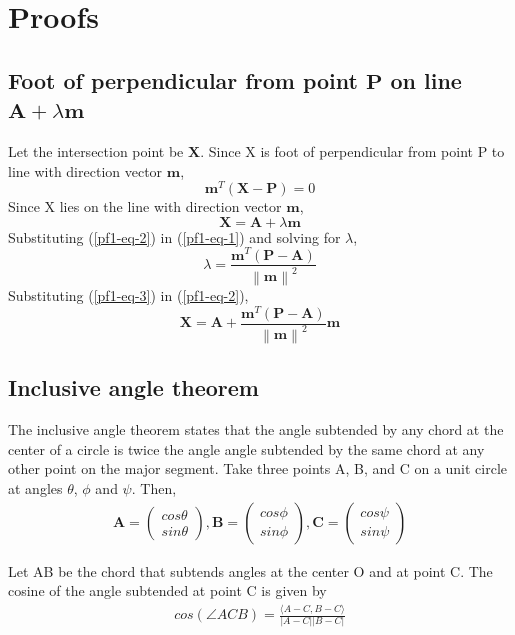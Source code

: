 \documentclass[journal,10pt,twocolumn]{article}
\providecommand{\norm}[1]{\left\lVert#1\right\rVert}
\let\vec\mathbf
\newcommand{\myvec}[1]{\ensuremath{\begin{pmatrix}#1\end{pmatrix}}}
\begin{document}
\section*{\large Proofs}
\subsection*{\normalsize Foot of perpendicular from point $\vec{P}$ on line $\vec{A}+\lambda\vec{m}$}
Let the intersection point be $\vec{X}$. Since X is foot of perpendicular from point P to line with direction vector $\vec{m}$,
\begin{equation}
	\vec{m}^T(\vec{X-P}) = 0
	\label{pf1-eq-1}
\end{equation}
Since X lies on the line with direction vector $\vec{m}$,
\begin{equation}
	\vec{X} = \vec{A}+\lambda\vec{m}
	\label{pf1-eq-2}
\end{equation}
Substituting (\ref{pf1-eq-2}) in (\ref{pf1-eq-1}) and solving for $\lambda$,
\begin{equation}
	\lambda = \frac{\vec{m}^T(\vec{P-A})}{\norm{\vec{m}}^2}
	\label{pf1-eq-3}
\end{equation}
Substituting (\ref{pf1-eq-3}) in (\ref{pf1-eq-2}),
\begin{equation}
\vec{X} = \vec{A} + \frac{\vec{m}^T(\vec{P-A})}{\norm{\vec{m}}^2}\vec{m} 
\end{equation}

\subsection*{\normalsize Inclusive angle theorem}
The inclusive angle theorem states that the angle subtended by any chord at the center of a circle is twice the angle angle subtended by the same chord at any other point on the major segment. Take three points A, B, and C on a unit circle at angles $\theta$, $\phi$ and $\psi$. Then,
\begin{eqnarray}
	\vec{A} = \myvec{cos\theta\\sin\theta},
	\vec{B} = \myvec{cos\phi\\sin\phi},
	\vec{C} = \myvec{cos\psi\\sin\psi}
\end{eqnarray}

Let AB be the chord that subtends angles at the center O and at point C. The cosine of the angle subtended at point C is given by
\begin{align}
	cos(\angle ACB) = \frac{\langle A-C, B-C\rangle}{|A-C||B-C|}
	\label{pf2-eq-1}
\end{align}
\end{document}
